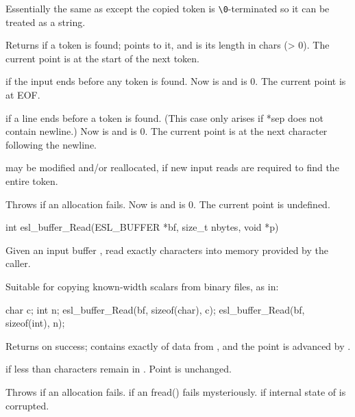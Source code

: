 \begin{sreapi}
Essentially the same as  
except the copied token is \verb+\0+-terminated so it
can be treated as a string.

Returns  if a token is found;  points to it,
and  is its length in chars (> 0). The current
point is at the start of the next token.

 if the input ends before any token is found.
Now  is  and  is 0. The current
point is at EOF.

 if a line ends before a token is found.  (This
case only arises if *sep does not contain newline.)
Now  is  and  is 0. The current
point is at the next character following the newline.

 may be modified and/or reallocated, if new
input reads are required to find the entire token.

Throws  if an allocation fails.
Now  is  and  is 0. The
current point is undefined.


\hypertarget{func:esl_buffer_Read()}
{\item[int esl\_buffer\_Read(ESL\_BUFFER *bf, size\_t nbytes, void *p)]}

Given an input buffer , read exactly 
characters into memory  provided by the caller.

Suitable for copying known-width scalars from
binary files, as in:
\begin{cchunk}
char c;
int  n;
esl_buffer_Read(bf, sizeof(char), c);
esl_buffer_Read(bf, sizeof(int),  n);
\end{cchunk}

Returns  on success;  contains exactly 
of data from , and the point is advanced by .

 if less than  characters remain 
in . Point is unchanged.

Throws  if an allocation fails.
 if an fread() fails mysteriously.
 if internal state of  is corrupted.


\end{sreapi}

